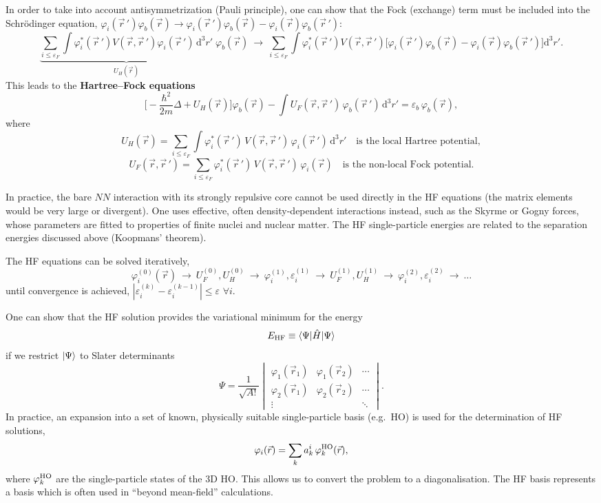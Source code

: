 \documentclass[11pt,a4paper]{article}
\newcommand{\op}[1]{\hat{#1}}
\newcommand{\ud}{\mathrm{d}}
\begin{document}
In order to take into account antisymmetrization (Pauli principle), one can show that the Fock (exchange) term must be included into the Schr\"odinger equation, $\varphi_i(\vec r\,')\varphi_b(\vec r)\to\varphi_i(\vec r\,')\varphi_b(\vec r)-\varphi_i(\vec r)\varphi_b(\vec r\,')$:
\[
\underbrace{\sum_{i\le\varepsilon_F}\int\varphi_i^*(\vec r\,')V(\vec r,\vec r\,')\varphi_i(\vec r\,')\,\ud^3r'}_{U_H(\vec r)}\;\varphi_b(\vec r)
\ \longrightarrow\
\sum_{i\le\varepsilon_F}\int\varphi_i^*(\vec r\,')V(\vec r,\vec r\,')\big[\varphi_i(\vec r\,')\varphi_b(\vec r)-\varphi_i(\vec r)\varphi_b(\vec r\,')\big]\ud^3r' .
\]
This leads to the \textbf{Hartree--Fock equations}
\[
\Big[-\frac{\hbar^2}{2m}\Delta+U_H(\vec r)\Big]\varphi_b(\vec r)-\int U_F(\vec r,\vec r\,')\,\varphi_b(\vec r\,')\,\ud^3r'=\varepsilon_b\,\varphi_b(\vec r),
\]
where
\[
U_H(\vec r)=\sum_{i\le\varepsilon_F}\int\varphi_i^*(\vec r\,')\,V(\vec r,\vec r\,')\,\varphi_i(\vec r\,')\,\ud^3r'
\quad\text{is the local Hartree potential},
\]
\[
U_F(\vec r,\vec r\,')=\sum_{i\le\varepsilon_F}\varphi_i^*(\vec r\,')\,V(\vec r,\vec r\,')\,\varphi_i(\vec r)
\quad\text{is the non-local Fock potential}.
\]

In practice, the bare $NN$ interaction with its strongly repulsive core cannot be used directly in the HF equations (the matrix elements would be very large or divergent). One uses effective, often density-dependent interactions instead, such as the Skyrme or Gogny forces, whose parameters are fitted to properties of finite nuclei and nuclear matter. The HF single-particle energies are related to the separation energies discussed above (Koopmans' theorem).

The HF equations can be solved iteratively,
\[
\varphi_i^{(0)}(\vec r)\ \to\ U_F^{(0)},U_H^{(0)}\ \to\ \varphi_i^{(1)},\varepsilon_i^{(1)}\ \to\ U_F^{(1)},U_H^{(1)}\ \to\ \varphi_i^{(2)},\varepsilon_i^{(2)}\ \to\ \dots
\]
until convergence is achieved, $|\varepsilon_i^{(k)}-\varepsilon_i^{(k-1)}|\le\varepsilon$ $\forall i$.

One can show that the HF solution provides the variational minimum for the energy
\[
E_{\rm HF}\equiv\braket{\Psi|\op H|\Psi}
\]
if we restrict $\ket\Psi$ to Slater determinants
\[
\Psi=\frac{1}{\sqrt{A!}}
\begin{vmatrix}
\varphi_1(\vec r_1)&\varphi_1(\vec r_2)&\cdots\\
\varphi_2(\vec r_1)&\varphi_2(\vec r_2)&\cdots\\
\vdots&&\ddots
\end{vmatrix}.
\]
In practice, an expansion into a set of known, physically suitable single-particle basis (e.g.\ HO) is used for the determination of HF solutions,
\[
\varphi_i(\vec r)=\sum_k a^i_k\,\varphi^{\rm HO}_k(\vec r),
\]
where $\varphi^{\rm HO}_k$ are the single-particle states of the 3D HO. This allows us to convert the problem to a diagonalisation. The HF basis represents a basis which is often used in ``beyond mean-field'' calculations.
\end{document}
